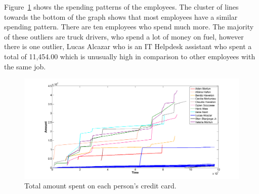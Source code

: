 \noindent  Figure~\ref{fig:spending} shows the spending patterns of the employees. The cluster of lines towards the bottom of the graph shows that most employees have a similar spending pattern. There are ten employees who spend much more. The majority of these outliers are truck drivers, who spend a lot of money on fuel, however there is one outlier, Lucas Alcazar who is an IT Helpdesk assistant who spent a total of 11,454.00 which is unusually high in comparison to other employees with the same job. \\
\begin{figure}[!ht]
\centering
\includegraphics[width=1.0\textwidth]{spending.png}
\caption{\label{fig:spending}Total amount spent on each person's credit card.}
\end{figure}




